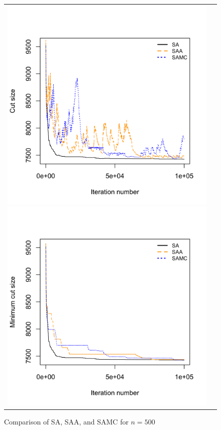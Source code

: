 \documentclass[11pt,]{article}
\begin{document}
\begin{figure}[hbpt]
  \begin{tabular}{cc}
    \includegraphics[width=.5\textwidth]{images/graph_cut_n500_iter1e+05}
    \includegraphics[width=.5\textwidth]{images/graph_min_cut_n500_iter1e+05}
  \end{tabular}
  \caption{Comparison of SA, SAA, and SAMC for $n = 500$}
  \label{fig:n500}
\end{figure}
\end{document}
